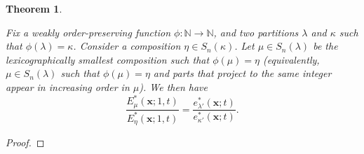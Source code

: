 \documentclass[12pt]{amsart}
\newtheorem{thm}{Theorem}[section]
\theoremstyle{definition}
\newcommand{\bfx}{\boldsymbol{x}}
\DeclareMathOperator{\inc}{inc}
\newcommand{\NN}{\mathbb N}
\def\LW#1{(\textcolor{teal}{LW:#1})}
\def\HBD#1{(\textcolor{violet}{HBD:#1})}
\begin{document}
\begin{appendices}
\begin{thm}\label{thm:recoloring}

Fix a weakly order-preserving function $\phi:\NN\rightarrow\NN$, and two partitions $\lambda$ and $\kappa$ such that $\phi(\lambda)=\kappa$.
Consider a composition  $\eta\in S_n(\kappa)$. Let $\mu \in S_n(\lambda)$ be the lexicographically smallest composition such that $\phi(\mu)=\eta$ (equivalently, $\mu \in S_n(\lambda)$ such that $\phi(\mu)=\eta$ and parts that project to the same integer appear in increasing order in $\mu$).
 We then have
\begin{equation}\label{eq:adjacent}
    \frac{E^*_\mu(\bfx;1,t)}{E^*_{\eta}(\bfx;1,t)}=\frac{e^*_{\lambda'}(\bfx;t)}{e^*_{\kappa'}(\bfx;t)}.
\end{equation}
\end{thm}


\begin{proof}

\end{proof}
\end{appendices}
\end{document}
